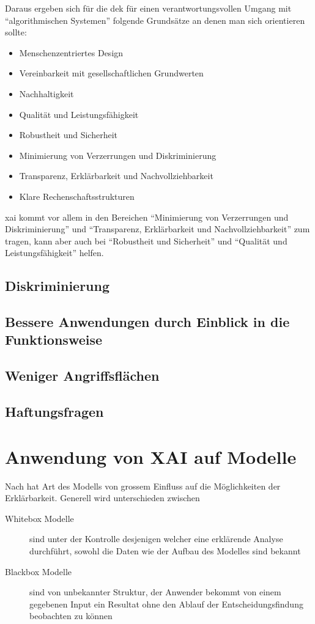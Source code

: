 \documentclass[
  12pt, %
  a4paper, %
  oneside, %
  openany, 
  numbers=noenddot, %
  BCOR=5mm, %
  parskip=half*, %
  thesis, %
]{bfhbook}
\begin{document}
Daraus ergeben sich für die \acrlong{dek} für einen verantwortungsvollen Umgang mit ``algorithmischen Systemen'' folgende Grundsätze an denen man sich orientieren sollte:

\begin{itemize}
	\item Menschenzentriertes Design
	\item Vereinbarkeit mit gesellschaftlichen Grundwerten
	\item Nachhaltigkeit
	\item Qualität und Leistungsfähigkeit
	\item Robustheit und Sicherheit
	\item Minimierung von Verzerrungen und Diskriminierung
	\item Transparenz, Erklärbarkeit und Nachvollziehbarkeit
	\item Klare Rechenschaftsstrukturen
\end{itemize}

\acrlong{xai} kommt vor allem in den Bereichen ``Minimierung von Verzerrungen und Diskriminierung'' und ``Transparenz, Erklärbarkeit und Nachvollziehbarkeit'' zum tragen, kann aber auch bei ``Robustheit und Sicherheit'' und ``Qualität und Leistungsfähigkeit'' helfen.

\section{Diskriminierung}

\section{Bessere Anwendungen durch Einblick in die Funktionsweise}

\section{Weniger Angriffsflächen}

\section{Haftungsfragen}

\chapter{Anwendung von XAI auf Modelle}
Nach \parencite{Oh2019} hat Art des Modells von grossem Einfluss auf die Möglichkeiten der Erklärbarkeit. Generell wird unterschieden zwischen
\begin{description}
\item[Whitebox Modelle] sind unter der Kontrolle desjenigen welcher eine erklärende Analyse durchführt, sowohl die Daten wie der Aufbau des Modelles sind bekannt
\item[Blackbox Modelle] sind von unbekannter Struktur, der Anwender bekommt von einem gegebenen Input ein Resultat ohne den Ablauf der Entscheidungsfindung beobachten zu können
\end{description}
\end{document}
